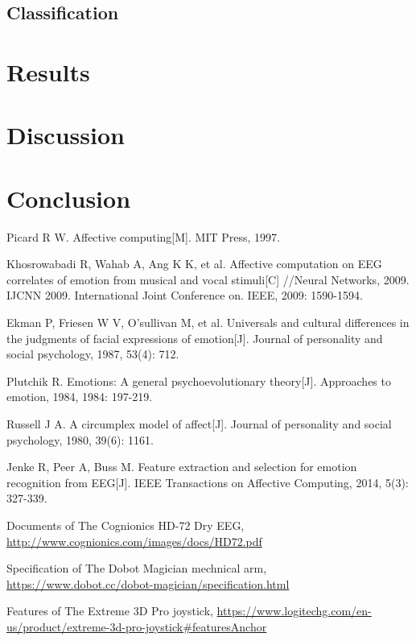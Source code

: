 \documentclass[runningheads,a4paper]{llncs}
\begin{document}
\subsection{Classification}

\section{Results}

\section{Discussion}

\section{Conclusion}



\begin{thebibliography}{4}

 Picard R W.
  Affective computing[M].
   MIT Press, 1997.

 Khosrowabadi R, Wahab A, Ang K K, et al.
Affective computation on EEG correlates of emotion from musical and vocal stimuli[C]
//Neural Networks, 2009. IJCNN 2009. International Joint Conference on. IEEE, 2009: 1590-1594.

 Ekman P, Friesen W V, O'sullivan M, et al.
Universals and cultural differences in the judgments of facial expressions of emotion[J].
Journal of personality and social psychology, 1987, 53(4): 712.

 Plutchik R.
Emotions: A general psychoevolutionary theory[J].
Approaches to emotion, 1984, 1984: 197-219.

 Russell J A.
A circumplex model of affect[J].
Journal of personality and social psychology, 1980, 39(6): 1161.

 Jenke R, Peer A, Buss M.
Feature extraction and selection for emotion recognition from EEG[J].
IEEE Transactions on Affective Computing, 2014, 5(3): 327-339.

 Documents of The Cognionics HD-72 Dry EEG,
\url{http://www.cognionics.com/images/docs/HD72.pdf}

 Specification of The Dobot Magician mechnical arm,
\url{https://www.dobot.cc/dobot-magician/specification.html}

 Features of The Extreme 3D Pro joystick,
\url{https://www.logitechg.com/en-us/product/extreme-3d-pro-joystick#featuresAnchor}

\end{thebibliography}
\end{document}
